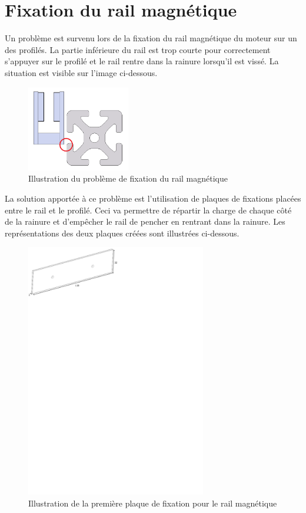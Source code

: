 \section{Fixation du rail magnétique}\label{FixRailMag}
Un problème est survenu lors de la fixation du rail magnétique du moteur sur un des profilés. La partie inférieure du rail est trop courte
pour correctement s'appuyer sur le profilé et le rail rentre dans la rainure lorsqu'il est vissé. La situation est visible sur l'image ci-dessous.

\begin{figure}[H]
    \centering
    \includegraphics[width = 0.4\textwidth]{assets/figures/FixationRailMagProb.png}
    \caption{Illustration du problème de fixation du rail magnétique}
    \label{fig:FixRailMagProb}
\end{figure}

La solution apportée à ce problème est l'utilisation de plaques de fixations placées entre le rail et le profilé. Ceci va permettre de répartir
la charge de chaque côté de la rainure et d'empêcher le rail de pencher en rentrant dans la rainure. Les représentations des deux plaques créées
sont illustrées ci-dessous.

\begin{figure}[H]
    \centering
    \includegraphics[width = 0.7\textwidth]{assets/figures/PlaqueFixation1.svg}
    \caption{Illustration de la première plaque de fixation pour le rail magnétique}
    \label{fig:PlaqueFix1}
\end{figure}

